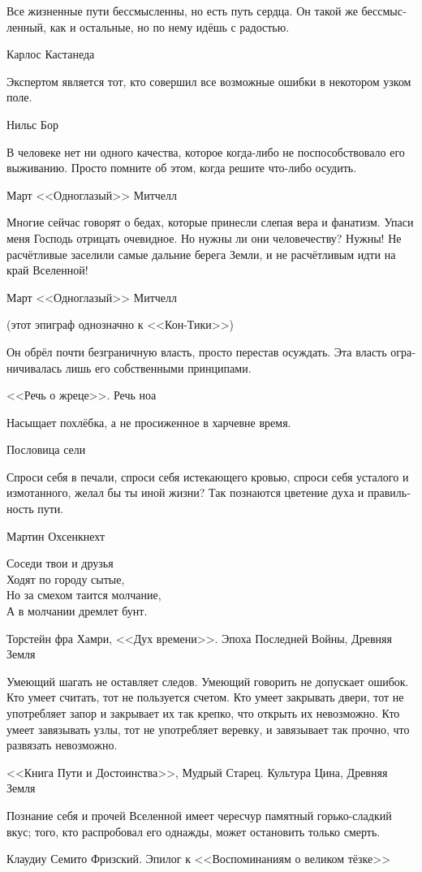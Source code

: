\documentclass[a4paper,12pt,fleqn]{book}\usepackage{polyglossia}\setdefaultlanguage[babelshorthands=true]{russian}\setotherlanguage{english}\defaultfontfeatures{Ligatures=TeX,Mapping=tex-text}\usepackage{xcolor}\newcommand{\ml}[3]{#2}
\begin{document}
{\epigraph
{Все жизненные пути бессмысленны, но есть путь сердца.
Он такой же бессмысленный, как и остальные, но по нему идёшь с радостью.}
{Карлос Кастанеда}

\epigraph
{Экспертом является тот, кто совершил все возможные ошибки в некотором узком поле.}
{Нильс Бор}

\epigraph
{В человеке нет ни одного качества, которое когда-либо не поспособствовало его выживанию.
Просто помните об этом, когда решите что-либо осудить.}
{Март <<Одноглазый>> Митчелл}

\epigraph
{Многие сейчас говорят о бедах, которые принесли слепая вера и фанатизм.
Упаси меня Господь отрицать очевидное.
Но нужны ли они человечеству?
Нужны!
Не расчётливые заселили самые дальние берега Земли, и не расчётливым идти на край Вселенной!}
{Март <<Одноглазый>> Митчелл}

(этот эпиграф однозначно к <<Кон-Тики>>)

\epigraph
{Он обрёл почти безграничную власть, просто перестав осуждать.
Эта власть ограничивалась лишь его собственными принципами.}
{<<Речь о жреце>>.
Речь ноа}

\epigraph
{Насыщает похлёбка, а не просиженное в харчевне время.}
{Пословица сели}

\epigraph
{Спроси себя в печали, спроси себя истекающего кровью, спроси себя усталого и измотанного, желал бы ты иной жизни?
Так познаются цветение духа и правильность пути.}
{Мартин Охсенкнехт}

\epigraph
{Соседи твои и друзья\\
Ходят по городу сытые,\\
Но за смехом таится молчание,\\
А в молчании дремлет бунт.}
{Торстейн фра Хамри, <<Дух времени>>.
Эпоха Последней Войны, Древняя Земля}

\epigraph
{Умеющий шагать не оставляет следов.
Умеющий говорить не допускает ошибок.
Кто умеет считать, тот не пользуется счетом.
Кто умеет закрывать двери, тот не употребляет запор и закрывает их так крепко, что открыть их невозможно.
Кто умеет завязывать узлы, тот не употребляет веревку, и завязывает так прочно, что развязать невозможно.}
{<<Книга Пути и Достоинства>>, Мудрый Старец.
Культура Цина, Древняя Земля}

\epigraph
{Познание себя и прочей Вселенной имеет чересчур памятный горько-сладкий вкус;
того, кто распробовал его однажды, может остановить только смерть.}
{Клаудиу Семито Фризский.
Эпилог к <<Воспоминаниям о великом тёзке>>}

}
\end{document}
